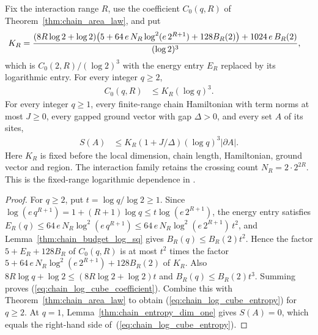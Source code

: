 \begin{corollary}
    \label{thm:chain_area_log_cube}
    \leanok
    Fix the interaction range $R$, use the coefficient $C_0(q,R)$ of
    Theorem~\ref{thm:chain_area_law}, and put
    \begin{align}
        K_R & =\frac{(8R\log2+\log2)\bigl(5+64\,e\,N_R\log^2(e\,2^{R+1})
            +128B_R(2)\bigr)+1024\,e\,B_R(2)}{(\log2)^3},\notag
    \end{align}
    which is $C_0(2,R)/(\log 2)^3$ with the energy entry $E_R$ replaced by its
    logarithmic entry. For every integer $q\ge2$,
    \begin{align}
        C_0(q,R) & \le K_R(\log q)^3.
        \label{eq:chain_log_cube_coefficient}
    \end{align}
    For every integer $q\ge1$, every finite-range chain Hamiltonian with
    term norms at most $J\ge0$, every gapped ground vector with gap
    $\Delta>0$, and every set $A$ of its sites,
    \begin{align}
        S(A) & \le K_R(1+J/\Delta)(\log q)^3|\partial A|.
        \label{eq:chain_log_cube_entropy}
    \end{align}
    Here $K_R$ is fixed before the local dimension, chain length,
    Hamiltonian, ground vector and region. The interaction family retains
    the crossing count $N_R=2\cdot2^{2R}$.
    This is the fixed-range logarithmic dependence in
    \cite[Part~I, Remark~6.3]{TNLean2026OneDimensional}.
\end{corollary}
\begin{proof}
    \leanok
    For $q\ge2$, put $t=\log q/\log2\ge1$. Since
    $\log(e\,q^{R+1})=1+(R+1)\log q\le t\log(e\,2^{R+1})$, the energy entry
    satisfies $E_R(q)\le64\,e\,N_R\log^2(e\,q^{R+1})\le
        64\,e\,N_R\log^2(e\,2^{R+1})\,t^2$, and
    Lemma~\ref{thm:chain_budget_log_sq} gives $B_R(q)\le B_R(2)t^2$. Hence
    the factor $5+E_R+128B_R$ of $C_0(q,R)$ is at most $t^2$ times the
    factor $5+64\,e\,N_R\log^2(e\,2^{R+1})+128B_R(2)$ of $K_R$. Also
    $8R\log q+\log2\le(8R\log2+\log2)t$ and $B_R(q)\le B_R(2)t^3$. Summing
    proves (\ref{eq:chain_log_cube_coefficient}). Combine this with
    Theorem~\ref{thm:chain_area_law} to obtain
    (\ref{eq:chain_log_cube_entropy}) for $q\ge2$.
    At $q=1$, Lemma~\ref{thm:chain_entropy_dim_one} gives $S(A)=0$,
    which equals the right-hand side of~(\ref{eq:chain_log_cube_entropy}).
\end{proof}


